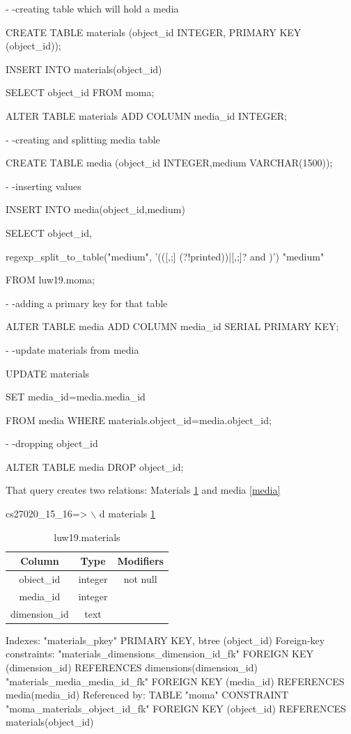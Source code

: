 \documentclass[journal,transmag]{IEEEtran}
\begin{document}
- -creating table which will hold a media

CREATE TABLE materials (object\_id INTEGER, PRIMARY KEY (object\_id));

INSERT INTO materials(object\_id)

    SELECT object\_id FROM moma;

ALTER TABLE materials ADD COLUMN media\_id INTEGER;

- -creating and splitting media table

CREATE TABLE media (object\_id INTEGER,medium VARCHAR(1500));

- -inserting values

INSERT INTO media(object\_id,medium)

    SELECT object\_id,

      regexp\_split\_to\_table("medium", '(([,;] (?!printed))|[,;]? and )') "medium"

FROM luw19.moma;

- -adding a primary key for that table

ALTER TABLE media ADD COLUMN media\_id SERIAL PRIMARY KEY;

- -update materials from media

UPDATE materials

SET media\_id=media.media\_id

FROM media WHERE materials.object\_id=media.object\_id;

- -dropping object\_id

ALTER TABLE media DROP object\_id;
\newline

That query creates two relations: Materials \ref{materials} and media \ref{media}
\newline

cs27020\_15\_16=> $\backslash$ d materials \ref{materials}
\newline

\begin{table}[]
\centering
\caption{luw19.materials}
\label{materials}
\begin{tabular}{c|c|c}
Column        & Type    & Modifiers \\ \hline
obiect\_id    & integer & not null  \\
media\_id     & integer &           \\
dimension\_id & text    &          
\end{tabular}
\end{table}


Indexes:
    "materials\_pkey" PRIMARY KEY, btree (object\_id)
Foreign-key constraints:
    "materials\_dimensions\_dimension\_id\_fk" FOREIGN KEY (dimension\_id) REFERENCES dimensions(dimension\_id)
    "materials\_media\_media\_id\_fk" FOREIGN KEY (media\_id) REFERENCES media(media\_id)
Referenced by:
    TABLE "moma" CONSTRAINT "moma\_materials\_object\_id\_fk" FOREIGN KEY (object\_id) REFERENCES materials(object\_id)
\newline
\end{document}
